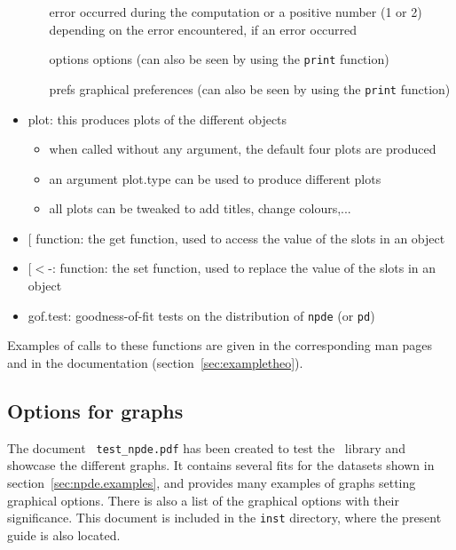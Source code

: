 \begin{itemize}
\begin{itemize}
error occurred during the computation or a positive number (1 or 2) depending on the error encountered, if an error 
occurred \item[options] options (can also be seen by using the \texttt{print} function) \item[prefs] graphical 
preferences (can also be seen by using the \texttt{print} function) \end{itemize} \item plot: this produces plots 
of the different objects \begin{itemize} \item when called without any argument, the default four plots are 
produced \item an argument plot.type can be used to produce different plots \item all plots can be tweaked to add 
titles, change colours,... \end{itemize} \item $[$ function: the get function, used to access the value of the 
slots in an object \item $[<$-: function: the set function, used to replace the value of the slots in an object 
\item gof.test: goodness-of-fit tests on the distribution of \texttt{npde} (or \texttt{pd}) \end{itemize} Examples 
of calls to these functions are given in the corresponding man pages and in the documentation 
(section~\ref{sec:exampletheo}).

\subsection{Options for graphs}

\hskip 18pt The document \verb+ test_npde.pdf+ has been created to test the \npde~library and showcase the 
different graphs. It contains several fits for the datasets shown in section~\ref{sec:npde.examples}, and provides 
many examples of graphs setting graphical options. There is also a list of the graphical options with their 
significance. This document is included in the \verb+inst+ directory, where the present guide is also located.

